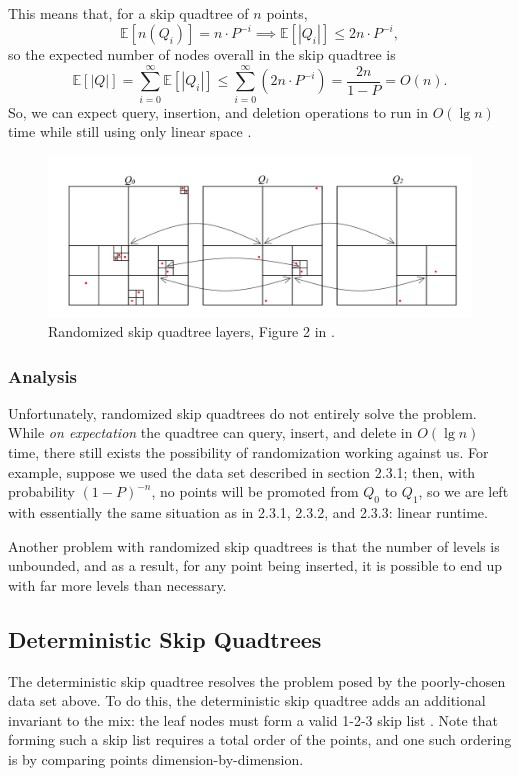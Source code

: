 \documentclass[12pt]{article}
\begin{document}
        This means that, for a skip quadtree of $n$ points,
        $$\mathbb{E}[n(Q_i)] = n \cdot P^{-i} \implies \mathbb{E}[|Q_i|] \leq 2n \cdot P^{-i},$$
        so the expected number of nodes overall in the skip quadtree is
        $$\mathbb{E}[|Q|] = \sum_{i = 0}^\infty \mathbb{E}[|Q_i|] \leq \sum_{i = 0}^\infty (2n \cdot P^{-i}) = \frac{2n}{1 - P} = O(n).$$
        So, we can expect query, insertion, and deletion operations to run in $O(\lg n)$ time while still using only linear space \cite{sqt}.
        
        \begin{figure}[ht!]
            \centering
          \includegraphics[scale=0.75]{RandomizedCompressedQuadtree1.png}
          \caption{Randomized skip quadtree layers, Figure 2 in \cite{sqt}.}
          \label{fig:4}
        \end{figure}
         
    \subsubsection{Analysis}
        Unfortunately, randomized skip quadtrees do not entirely solve the problem. While \textit{on expectation} the quadtree can query, insert, and delete in $O(\lg n)$ time, there still exists the possibility of randomization working against us. For example, suppose we used the data set described in section 2.3.1; then, with probability $(1 - P)^{-n}$, no points will be promoted from $Q_0$ to $Q_1$, so we are left with essentially the same situation as in 2.3.1, 2.3.2, and 2.3.3: linear runtime.
        
        Another problem with randomized skip quadtrees is that the number of levels is unbounded, and as a result, for any point being inserted, it is possible to end up with far more levels than necessary.
        
    \subsection{Deterministic Skip Quadtrees}
        The deterministic skip quadtree resolves the problem posed by the poorly-chosen data set above. To do this, the deterministic skip quadtree adds an additional invariant to the mix: the leaf nodes must form a valid 1-2-3 skip list \cite{dsl}. Note that forming such a skip list requires a total order of the points, and one such ordering is by comparing points dimension-by-dimension.
        
\end{document}
